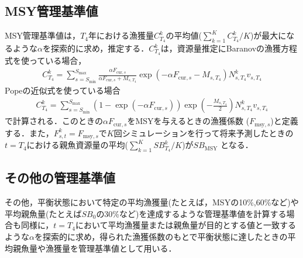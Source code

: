 \documentclass[11pt]{jsarticle}
\begin{document}
\subsection{MSY管理基準値}
MSY管理基準値は，$T_4$年における漁獲量$C_{T_4}^k$の平均値($\sum_{k=1}^K C_{T_4}^k / K$)が最大になるような$\alpha$を探索的に求め，推定する．$C_{T_4}^k$は，資源量推定にBaranovの漁獲方程式を使っている場合，
\begin{eqnarray}
  C_{T_4}^k=\sum_{s=S_{\mathrm{min}}}^{S_{\mathrm{max}}} \frac{\alpha F_{\mathrm{cur},s}}{\alpha F_{\mathrm{cur},s}+M_{s,T_4}}
  \exp(-\alpha F_{\mathrm{cur},s}-M_{s,T_4}) N_{s,T_4}^k v_{s,T_4}
\end{eqnarray}
Popeの近似式を使っている場合
\begin{eqnarray}
  C_{T_4}^k=\sum_{s=S_{\mathrm{min}}}^{S_{\mathrm{max}}} (1-\exp(-\alpha F_{\mathrm{cur},s})) \exp(-\frac{M_{s,T_4}}{2})N_{s,T_4}^k v_{s,T_4} 
\end{eqnarray}
で計算される．このときの$\alpha F_{\mathrm{cur},s}$をMSYを与えるときの漁獲係数 ($F_{\mathrm{msy},s}$)と定義する．また，$F_{s,t}^k=F_{\mathrm{msy},s}$で$K$回シミュレーションを行って将来予測したときの$t=T_4$における親魚資源量の平均($\sum_{k=1}^K S\!B_{T_4}^k /K$)が$S\!B_{\mathrm{MSY}}$ となる．

\subsection{その他の管理基準値}
その他，平衡状態において特定の平均漁獲量(たとえば，MSYの10\%,60\%など)や平均親魚量(たとえば$S\!B_0$の30\%など)を達成するような管理基準値を計算する場合も同様に，$t=T_4$において平均漁獲量または親魚量が目的とする値と一致するような$\alpha$を探索的に求め，得られた漁獲係数のもとで平衡状態に達したときの平均親魚量や漁獲量を管理基準値として用いる．
\end{document}
